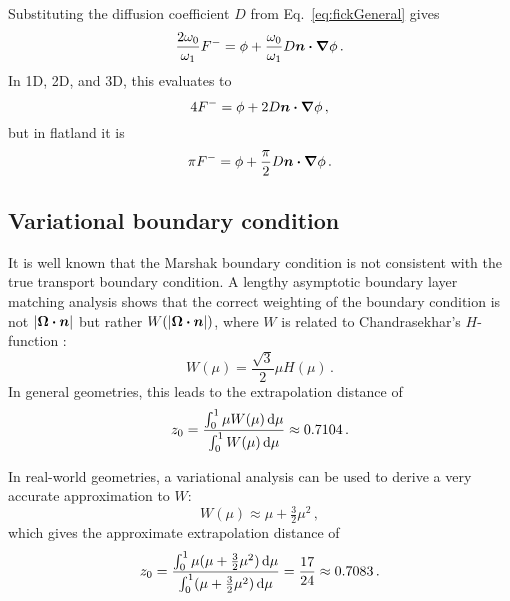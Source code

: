 Substituting the diffusion coefficient $D$ from Eq.~\eqref{eq:fickGeneral} gives
\begin{equation*}
\frac{2\omega_0}{\omega_1} F^{-}
= \phi + \frac{\omega_0}{\omega_1} D \bm{n} \bm{\cdot} \bm{\nabla} \phi\,.
\end{equation*}
In 1D, 2D, and 3D, this evaluates to
\begin{equation*}
4 F^{-}
= \phi + 2 D \bm{n} \bm{\cdot} \bm{\nabla} \phi\,,
\end{equation*}
but in flatland it is
\begin{equation*}
\pi F^{-}
= \phi + \frac{\pi}{2} D \bm{n} \bm{\cdot} \bm{\nabla} \phi\,.
\end{equation*}

\subsection{Variational boundary condition} \label{sec:varBndy}
It is well known that the Marshak boundary condition is not consistent with the
true transport boundary condition. A lengthy asymptotic boundary layer
matching analysis \cite{Hab1975} shows that the correct weighting of the
boundary condition is not $\left| \bm{\Omega}\bm{\cdot}\bm{n} \right|$ but rather
$W(\left| \bm{\Omega}\bm{\cdot}\bm{n} \right|)$, where $W$ is related to Chandrasekhar's
$H$-function \cite{Cha1960}:
\begin{equation} \label{eq:chandraW}
  W(\mu) = \frac{\sqrt{3}}{2} \mu H(\mu) \,.
\end{equation}
In general geometries, this leads to the extrapolation distance of
\begin{align*}
  z_0 = \frac{\int_{0}^{1} \mu W(\mu) \mathop{}\!\mathrm{d} \mu}{\int_{0}^{1} W(\mu) \mathop{}\!\mathrm{d}
  \mu} \approx 0.7104\,.
\end{align*}

In real-world geometries, a variational analysis \cite{Mal1991} can be used to
derive a very accurate approximation to $W$:
\begin{equation*}
W(\mu) \approx \mu + \tfrac{3}{2} \mu^2 \,,
\end{equation*}
which gives the approximate extrapolation distance of
\begin{equation*}
  z_0 = \frac{\int_{0}^{1} \mu (\mu + \tfrac{3}{2} \mu^2 ) \mathop{}\!\mathrm{d}
  \mu}{\int_{0}^{1} (\mu + \tfrac{3}{2} \mu^2 ) \mathop{}\!\mathrm{d} \mu} 
  = \frac{17}{24} \approx 0.7083 \,.
\end{equation*}

